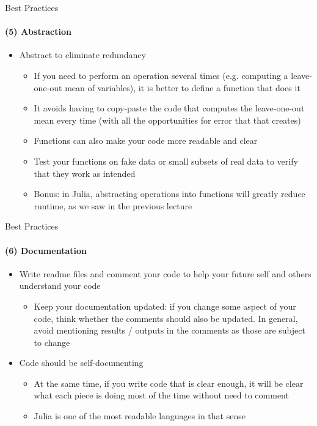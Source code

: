 \documentclass[10pt, aspectratio=169, xcolor=dvipsnames]{beamer}
\let\olditem\item
\renewcommand{\item}{%
\olditem\vspace{0.3em}}
\begin{document}
\begin{frame}[t]{Best Practices}
    \framesubtitle{(5) Abstraction}

    \normalsize\vspace{0.5em} \begin{itemize}
        \item Abstract to eliminate redundancy \begin{itemize}
            \item If you need to perform an operation several times (e.g. computing a leave-one-out mean of variables), it is better to define a function that does it 
            \item It avoids having to copy-paste the code that computes the leave-one-out mean every time (with all the opportunities for error that that creates)
            \item Functions can also make your code more readable and clear
            \item Test your functions on fake data or small subsets of real data to verify that they work as intended
            \item Bonus: in Julia, abstracting operations into functions will greatly reduce runtime, as we saw in the previous lecture
        \end{itemize}
    \end{itemize}
\end{frame}

\begin{frame}[t]{Best Practices}
    \framesubtitle{(6) Documentation}

    \normalsize\vspace{0.5em} \begin{itemize}
        \item Write readme files and comment your code to help your future self and others understand your code \begin{itemize}
            \item Keep your documentation updated: if you change some aspect of your code, think whether the comments should also be updated. In general, avoid mentioning results / outputs in the comments as those are subject to change
        \end{itemize}
        \item Code should be self-documenting \begin{itemize}
            \item At the same time, if you write code that is clear enough, it will be clear what each piece is doing most of the time without need to comment
            \item Julia is one of the most readable languages in that sense
        \end{itemize}
    \end{itemize}
\end{frame}
\end{document}
